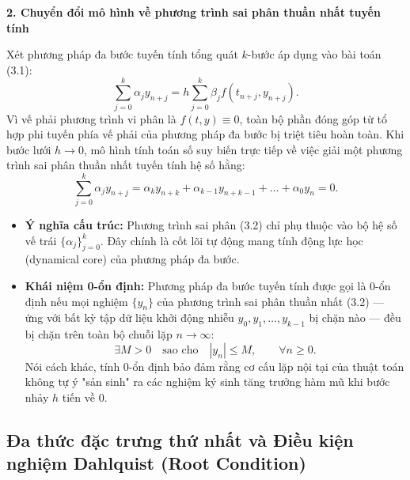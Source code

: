 \vspace{0.5em}
\noindent \textbf{2. Chuyển đổi mô hình về phương trình sai phân thuần nhất tuyến tính}

\noindent Xét phương pháp đa bước tuyến tính tổng quát $k$-bước áp dụng vào bài toán (3.1):
\[
    \sum_{j=0}^{k} \alpha_j y_{n+j} = h \sum_{j=0}^{k} \beta_j f(t_{n+j}, y_{n+j}).
\]
Vì vế phải phương trình vi phân là $f(t, y) \equiv 0$, toàn bộ phần đóng góp từ tổ hợp phi tuyến phía vế phải của phương pháp đa bước bị triệt tiêu hoàn toàn. Khi bước lưới $h \to 0$, mô hình tính toán số suy biến trực tiếp về việc giải một phương trình sai phân thuần nhất tuyến tính hệ số hằng:
\begin{equation}
    \sum_{j=0}^{k} \alpha_j y_{n+j} = \alpha_k y_{n+k} + \alpha_{k-1} y_{n+k-1} + \dots + \alpha_0 y_n = 0. \tag{3.2}
\end{equation}

\begin{itemize}
    \item \textbf{Ý nghĩa cấu trúc:} Phương trình sai phân (3.2) chỉ phụ thuộc vào bộ hệ số vế trái $\{\alpha_j\}_{j=0}^k$. Đây chính là cốt lõi tự động mang tính động lực học (dynamical core) của phương pháp đa bước.
    \item \textbf{Khái niệm 0-ổn định:} Phương pháp đa bước tuyến tính được gọi là 0-ổn định nếu mọi nghiệm $\{y_n\}$ của phương trình sai phân thuần nhất (3.2) — ứng với bất kỳ tập dữ liệu khởi động nhiễu $y_0, y_1, \dots, y_{k-1}$ bị chặn nào — đều bị chặn trên toàn bộ chuỗi lặp $n \to \infty$:
    \[
        \exists M > 0 \quad \text{sao cho} \quad |y_n| \le M, \qquad \forall n \ge 0.
    \]
    Nói cách khác, tính 0-ổn định bảo đảm rằng cơ cấu lặp nội tại của thuật toán không tự ý "sản sinh" ra các nghiệm ký sinh tăng trưởng hàm mũ khi bước nhảy $h$ tiến về $0$.
\end{itemize}

\subsection{Đa thức đặc trưng thứ nhất và Điều kiện nghiệm Dahlquist (Root Condition)}

